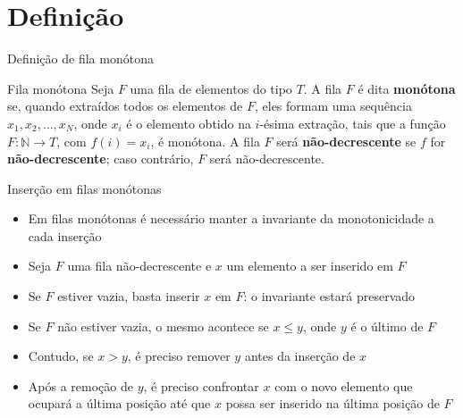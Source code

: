 \section{Definição}

\begin{frame}[fragile]{Definição de fila monótona}

    \begin{block}{Fila monótona}
        Seja $F$ uma fila de elementos do tipo $T$. A fila $F$ é dita \textbf{monótona} se, quando extraídos todos
        os elementos de $F$, eles formam uma sequência $x_1, x_2, \ldots, x_N$, onde $x_i$ é o elemento
        obtido na $i$-ésima extração, tais que a função $F : \mathbb{N}\to T$, com $f(i) = x_i$, é monótona.
        \newline\newline
        A fila $F$ será \textbf{não-decrescente} se $f$ for \textbf{não-decrescente}; caso contrário, $F$ será
        não-decrescente.
    \end{block}

\end{frame}


\begin{frame}[fragile]{Inserção em filas monótonas}

    \begin{itemize}
        \item Em filas monótonas é necessário manter a invariante da monotonicidade a cada inserção

        \item Seja $F$ uma fila não-decrescente e $x$ um elemento a ser inserido em $F$

        \item Se $F$ estiver vazia, basta inserir $x$ em $F$: o invariante estará preservado

        \item Se $F$ não estiver vazia, o mesmo acontece se $x\leq y$, onde $y$ é o último de $F$ 

        \item Contudo, se $x > y$, é preciso remover $y$ antes da inserção de $x$

        \item Após a remoção de $y$, é preciso confrontar $x$ com o novo elemento que ocupará a última posição até que $x$ possa ser inserido na última posição de $F$
    \end{itemize}
\end{frame}



